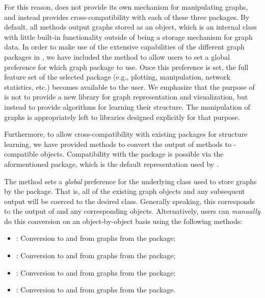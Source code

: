\documentclass[article]{jss}
\renewcommand{\|}{\,|\,}
\begin{document}
For this reason,  does not provide its own mechanism for manipulating graphs, and instead provides cross-compatibility with each of these three packages. By default, all methods output graphs stored as an  object, which is an internal class with little built-in functionality outside of being a storage mechanism for graph data. In order to make use of the extensive capabilities of the different graph packages in , we have included the  method to allow users to set a global preference for which graph package to use. Once this preference is set, the full feature set of the selected package (e.g., plotting, manipulation, network statistics, etc.) becomes available to the user. We emphasize that the purpose of  is not to provide a new library for graph representation and visualization, but instead to provide algorithms for learning their structure. The manipulation of graphs is appropriately left to libraries designed explicitly for that purpose.

Furthermore, to allow cross-compatibility with existing packages for structure learning, we have provided methods to convert the output of  methods to -compatible objects. Compatibility with the  package is possible via the aformentioned  package, which is the default representation used by .

The  method sets a \emph{global} preference for the underlying class used to store graphs by the package. That is, all of the existing graph objects and any subsequent output will be coerced to the desired class. Generally speaking, this corresponds to the output of  and any corresponding  objects. Alternatively, users can \emph{manually} do this conversion on an object-by-object basis using the following methods:
\begin{itemize}
\item {}: Conversion to and from  graphs from the  package;
\item {}: Conversion to and from  graphs from the  package;
\item {}: Conversion to and from  graphs from the  package;
\item {}: Conversion to and from  graphs from the  package.
\end{itemize}
\end{document}
